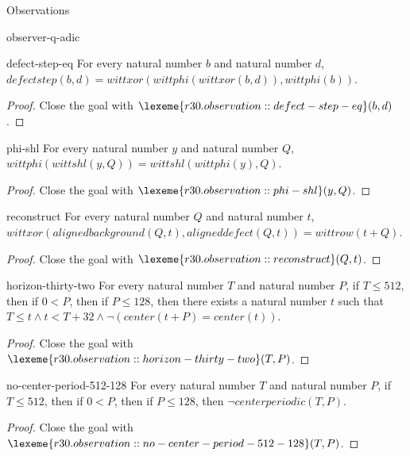 \begin{lexlean}{Observations}
\begin{section}{observer-q-adic}
\begin{theorem}{defect-step-eq}
For every natural number \(b\) and natural number \(d\), \(defectstep(b, d) = wittxor(wittphi(wittxor(b, d)), wittphi(b))\).
\begin{proof}
Close the goal with \(\lexeme{r30.observation::defect-step-eq}(b, d)\).
\end{proof}
\end{theorem}

\begin{theorem}{phi-shl}
For every natural number \(y\) and natural number \(Q\), \(wittphi(wittshl(y, Q)) = wittshl(wittphi(y), Q)\).
\begin{proof}
Close the goal with \(\lexeme{r30.observation::phi-shl}(y, Q)\).
\end{proof}
\end{theorem}

\begin{theorem}{reconstruct}
For every natural number \(Q\) and natural number \(t\), \(wittxor(alignedbackground(Q, t), aligneddefect(Q, t)) = wittrow(t + Q)\).
\begin{proof}
Close the goal with \(\lexeme{r30.observation::reconstruct}(Q, t)\).
\end{proof}
\end{theorem}

\begin{theorem}{horizon-thirty-two}
For every natural number \(T\) and natural number \(P\), if \(T ≤ 512\), then if \(0 < P\), then if \(P ≤ 128\), then there exists a natural number \(t\) such that \(T ≤ t ∧ t < T + 32 ∧ ¬ (center(t + P) = center(t))\).
\begin{proof}
Close the goal with \(\lexeme{r30.observation::horizon-thirty-two}(T, P)\).
\end{proof}
\end{theorem}

\begin{theorem}{no-center-period-512-128}
For every natural number \(T\) and natural number \(P\), if \(T ≤ 512\), then if \(0 < P\), then if \(P ≤ 128\), then \(¬ centerperiodic(T, P)\).
\begin{proof}
Close the goal with \(\lexeme{r30.observation::no-center-period-512-128}(T, P)\).
\end{proof}
\end{theorem}


\end{section}
\end{lexlean}
